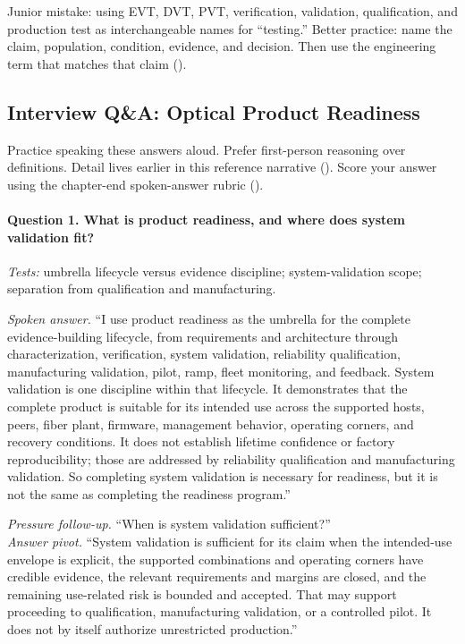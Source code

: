 Junior mistake: using EVT, DVT, PVT, verification, validation, qualification,
and production test as interchangeable names for ``testing.'' Better practice:
name the claim, population, condition, evidence, and decision. Then use the
engineering term that matches that claim
().

\subsection{Interview Q\&A: Optical Product Readiness}
\label{sec:validation-interview-qa}

Practice speaking these answers aloud. Prefer first-person reasoning over
definitions. Detail lives earlier in this reference narrative
().
Score your answer using the chapter-end spoken-answer rubric
().

\paragraph{Question 1. What is product readiness, and where does system
validation fit?}
\textit{Tests:} umbrella lifecycle versus evidence discipline;
system-validation scope; separation from qualification and manufacturing.

\textit{Spoken answer.}
``I use product readiness as the umbrella for the complete evidence-building
lifecycle, from requirements and architecture through characterization,
verification, system validation, reliability qualification, manufacturing
validation, pilot, ramp, fleet monitoring, and feedback. System validation is
one discipline within that lifecycle. It demonstrates that the complete product
is suitable for its intended use across the supported hosts, peers, fiber plant,
firmware, management behavior, operating corners, and recovery conditions. It
does not establish lifetime confidence or factory reproducibility; those are
addressed by reliability qualification and manufacturing validation. So
completing system validation is necessary for readiness, but it is not the same
as completing the readiness program.''

\textit{Pressure follow-up.} ``When is system validation sufficient?''\\
\textit{Answer pivot.} ``System validation is sufficient for its claim when the
intended-use envelope is explicit, the supported combinations and operating
corners have credible evidence, the relevant requirements and margins are
closed, and the remaining use-related risk is bounded and accepted. That may
support proceeding to qualification, manufacturing validation, or a controlled
pilot. It does not by itself authorize unrestricted production.''

